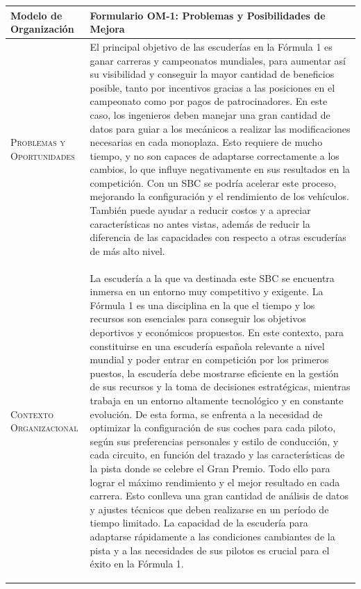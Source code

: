 \documentclass[12pt,a4paper,twoside,spanish]{article}      %
\begin{document}
\begin{table}[H]
\scriptsize
\begin{tabularx}{\textwidth}{|l|X|} \hline
\textbf{Modelo de Organización} & \textbf{Formulario OM-1: Problemas y Posibilidades de Mejora} \\ \hline\hline

\textsc{Problemas y Oportunidades} & El principal objetivo de las escuderías en la Fórmula 1 es ganar carreras y campeonatos mundiales, para aumentar así su visibilidad y conseguir la mayor cantidad de beneficios posible, tanto por incentivos gracias a las posiciones en el campeonato como por pagos de patrocinadores. En este caso, los ingenieros deben manejar una gran cantidad de datos para guiar a los mecánicos a realizar las modificaciones necesarias en cada monoplaza. Esto requiere de mucho tiempo, y no son capaces de adaptarse correctamente a los cambios, lo que influye negativamente en sus resultados en la competición. Con un SBC se podría acelerar este proceso, mejorando la configuración y el rendimiento de los vehículos. También puede ayudar a reducir costos y a apreciar características no antes vistas, además de reducir la diferencia de las capacidades con respecto a otras escuderías de más alto nivel.
 \\ \hline
\textsc{Contexto Organizacional} & 
La escudería a la que va destinada este SBC se encuentra inmersa en un entorno muy competitivo y exigente. La Fórmula 1 es una disciplina en la que el tiempo y los recursos son esenciales para conseguir los objetivos deportivos y económicos propuestos. En este contexto, para constituirse en una escudería española relevante a nivel mundial y poder entrar en competición por los primeros puestos, la escudería debe mostrarse eficiente en la gestión de sus recursos y la toma de decisiones estratégicas, mientras trabaja en un entorno altamente tecnológico y en constante evolución. De esta forma, se enfrenta a la necesidad de optimizar la configuración de sus coches para cada piloto, según sus preferencias personales y estilo de conducción, y cada circuito, en función del trazado y las características de la pista donde se celebre el Gran Premio. Todo ello para lograr el máximo rendimiento y el mejor resultado en cada carrera. Esto conlleva una gran cantidad de análisis de datos y ajustes técnicos que deben realizarse en un período de tiempo limitado. La capacidad de la escudería para adaptarse rápidamente a las condiciones cambiantes de la pista y a las necesidades de sus pilotos es crucial para el éxito en la Fórmula 1.     
\begin{enumerate} 

\end{enumerate}
\end{tabularx}
\end{table}
\end{document}
